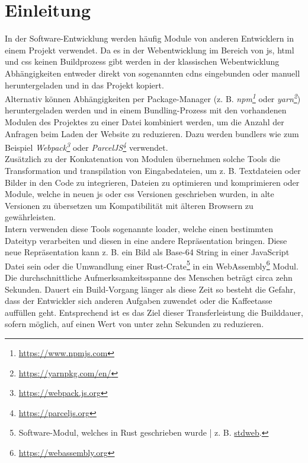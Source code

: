 \documentclass[11pt]{report}
\begin{document}
    \chapter{Einleitung}
    	In der Software-Entwicklung werden häufig Module von anderen Entwicklern in einem Projekt verwendet. Da es in der Webentwicklung im Bereich von \Gls{js}, \Gls{html} und \Gls{css} keinen Buildprozess gibt werden in der klassischen Webentwicklung Abhängigkeiten entweder direkt von sogenannten \Glspl{cdn} eingebunden oder manuell heruntergeladen und in das Projekt kopiert.\\
		Alternativ können Abhängigkeiten per Package-Manager (z. B. \emph{npm\footnote{\url{https://www.npmjs.com}}} oder \emph{yarn\footnote{\url{https://yarnpkg.com/en/}}}) heruntergeladen werden und in einem Bundling-Prozess mit den vorhandenen Modulen des Projektes zu einer Datei kombiniert werden, um die Anzahl der Anfragen beim Laden der Website zu reduzieren. Dazu werden \Glspl{bundler} wie zum Beispiel \emph{Webpack\footnote{\url{https://webpack.js.org}}} oder \emph{ParcelJS\footnote{\url{https://parceljs.org}}} verwendet.\\
		Zusätzlich zu der Konkatenation von Modulen übernehmen solche Tools die Transformation und \Gls{transpilation} von Eingabedateien, um z. B. Textdateien oder Bilder in den Code zu integrieren, Dateien zu optimieren und komprimieren oder Module, welche in neuen \Gls{js} oder \Gls{css} Versionen geschrieben wurden, in alte Versionen zu übersetzen um Kompatibilität mit älteren Browsern zu gewährleisten.\\
		Intern verwenden diese Tools sogenannte \Gls{loader}, welche einen bestimmten Dateityp verarbeiten und diesen in eine andere Repräsentation bringen. Diese neue Repräsentation kann z. B. ein Bild als Base-64 String in einer JavaScript Datei sein oder die Umwandlung einer Rust-Crate\footnote{Software-Modul, welches in Rust geschrieben wurde | z. B. \href{https://crates.io/crates/stdweb}{stdweb}.} in ein WebAssembly\footnote{\url{https://webassembly.org}} Modul.\\
		Die durchschnittliche Aufmerksamkeitsspanne des Menschen beträgt circa zehn Sekunden. Dauert ein Build-Vorgang länger als diese Zeit so besteht die Gefahr, dass der Entwickler sich anderen Aufgaben zuwendet oder die Kaffeetasse auffüllen geht. Entsprechend ist es das Ziel dieser Transferleistung die Builddauer, sofern möglich, auf einen Wert von unter zehn Sekunden zu reduzieren.\\
\end{document}
